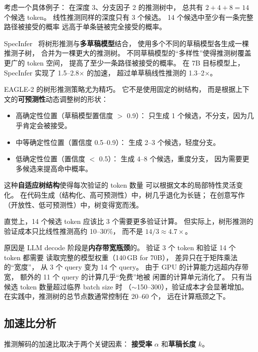 考虑一个具体例子：
在深度 3、分支因子 2 的推测树中，
总共有 $2 + 4 + 8 = 14$ 个候选 token。
线性推测同样的深度只有 3 个候选。
14 个候选中至少有一条完整路径被接受的概率
远高于单条链被完全接受的概率。

SpecInfer~\cite{miao2024specinfer}
将树形推测与\textbf{多草稿模型}结合，
使用多个不同的草稿模型各生成一棵推测子树，
合并为一棵更大的推测树。
不同草稿模型的“多样性”使得推测树覆盖更广的 token 空间，
提高了至少一条路径被接受的概率。
在 7B 目标模型上，SpecInfer 实现了 1.5--2.8$\times$ 的加速，
超过单草稿线性推测的 1.3--2$\times$。

EAGLE-2 的树形推测策略尤为精巧。
它不是使用固定的树结构，
而是根据上下文的\textbf{可预测性}动态调整树的形状：
\begin{itemize}[noitemsep]
  \item 高确定性位置（草稿模型置信度 $>$ 0.9）：
        只生成 1 个候选，不分支，因为几乎肯定会被接受。
  \item 中等确定性位置（置信度 0.5--0.9）：
        生成 2--3 个候选，轻度分支。
  \item 低确定性位置（置信度 $<$ 0.5）：
        生成 4--8 个候选，重度分支，
        因为需要更多候选来提高命中概率。
\end{itemize}
这种\textbf{自适应树结构}使得每次验证的 token 数量
可以根据文本的局部特性灵活变化。
在代码生成（结构化、高可预测性）中，树几乎退化为长链；
在创意写作（开放性、低可预测性）中，树变得宽而浅。

\begin{whybox}[树形推测为什么不需要更多的验证计算？]
直觉上，14 个候选 token 应该比 3 个需要更多验证计算。
但实际上，树形推测的验证成本只比线性推测高约 10--30\%，
而不是 $14/3 \approx 4.7\times$。

原因是 LLM decode 阶段是\textbf{内存带宽瓶颈}的。
验证 3 个 token 和验证 14 个 token 都需要
读取完整的模型权重（140\,GB for 70B），
差异只在于矩阵乘法的“宽度”，
从 3 个 query 变为 14 个 query。
由于 GPU 的计算能力远超内存带宽，
额外的 11 个 query 的计算几乎“免费”地被
闲置的计算单元消化了。
只有当候选 token 数量超过临界 batch size 时
（$\sim$150--300），验证成本才会显著增加。
在实践中，推测树的总节点数通常控制在 20--60 个，
远在计算瓶颈之下。
\end{whybox}

\subsection{加速比分析}

推测解码的加速比取决于两个关键因素：
\textbf{接受率} $\alpha$ 和\textbf{草稿长度} $k$。

